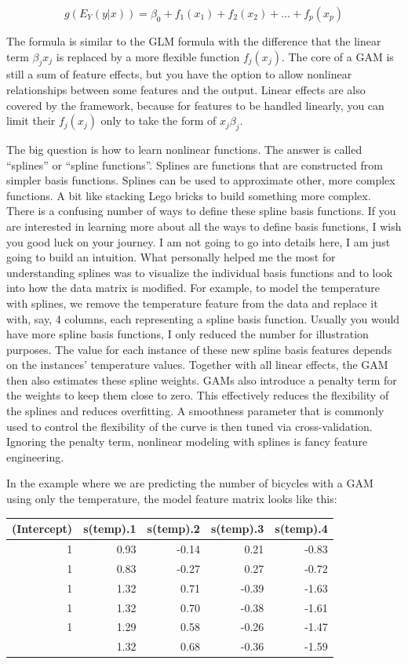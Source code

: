 \documentclass[
  10pt,
]{scrbook}
\begin{document}
\[g(E_Y(y|x))=\beta_0+f_1(x_{1})+f_2(x_{2})+\ldots+f_p(x_{p})\]

The formula is similar to the GLM formula with the difference that the linear term \(\beta_j{}x_{j}\) is replaced by a more flexible function \(f_j(x_{j})\).
The core of a GAM is still a sum of feature effects, but you have the option to allow nonlinear relationships between some features and the output.
Linear effects are also covered by the framework, because for features to be handled linearly, you can limit their \(f_j(x_{j})\) only to take the form of \(x_{j}\beta_j\).

The big question is how to learn nonlinear functions.
The answer is called ``splines'' or ``spline functions''.
Splines are functions that are constructed from simpler basis functions.
Splines can be used to approximate other, more complex functions.
A bit like stacking Lego bricks to build something more complex.
There is a confusing number of ways to define these spline basis functions.
If you are interested in learning more about all the ways to define basis functions, I wish you good luck on your journey.
I am not going to go into details here, I am just going to build an intuition.
What personally helped me the most for understanding splines was to visualize the individual basis functions and to look into how the data matrix is modified.
For example, to model the temperature with splines, we remove the temperature feature from the data and replace it with, say, 4 columns, each representing a spline basis function.
Usually you would have more spline basis functions, I only reduced the number for illustration purposes.
The value for each instance of these new spline basis features depends on the instances' temperature values.
Together with all linear effects, the GAM then also estimates these spline weights.
GAMs also introduce a penalty term for the weights to keep them close to zero.
This effectively reduces the flexibility of the splines and reduces overfitting.
A smoothness parameter that is commonly used to control the flexibility of the curve is then tuned via cross-validation.
Ignoring the penalty term, nonlinear modeling with splines is fancy feature engineering.

In the example where we are predicting the number of bicycles with a GAM using only the temperature, the model feature matrix looks like this:

\begin{table}
\centering
\begin{tabular}{rrrrr}
\toprule
(Intercept) & s(temp).1 & s(temp).2 & s(temp).3 & s(temp).4\\
\midrule
1 & 0.93 & -0.14 & 0.21 & -0.83\\
1 & 0.83 & -0.27 & 0.27 & -0.72\\
1 & 1.32 & 0.71 & -0.39 & -1.63\\
1 & 1.32 & 0.70 & -0.38 & -1.61\\
1 & 1.29 & 0.58 & -0.26 & -1.47\\
\addlinespace
1 & 1.32 & 0.68 & -0.36 & -1.59\\
\bottomrule
\end{tabular}
\end{table}
\end{document}
